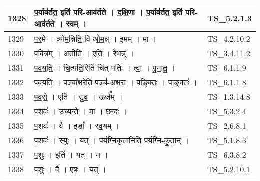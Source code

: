 \documentclass[17pt]{extarticle}
\begin{document}
\begin{longtable}{||p{0.4in}||p{4.9in}||p{0.9in}||}
    \hline
        
    1328 & प॒र्याव॑र्तत॒ इति॑ परि{-}आव॑र्तते   ।   द॒क्षि॒णा   ।   प॒र्याव॑र्तत॒ इति॑ परि{-}आव॑र्तते   ।   स्वम्   ।    & TS\_5.2.1.3       \\
    
    \hline
        
    1329 & प॒र॒मे   ।   व्यो॑म॒न्निति॒ वि{-}ओ॒म॒न्न्   ।   इ॒मम्   ।   मा   ।    & TS\_4.2.10.2       \\
    
    \hline
        
    1330 & प॒वित्र᳚म्   ।   अतीति॑   ।   ए॒ति॒   ।   रेभन्न्॑   ।    & TS\_3.4.11.2       \\
    
    \hline
        
    1331 & प॒व॒य॒ति॒   ।   चि॒त्पति॒रिति॑ चित्{-}पतिः॑   ।   त्वा॒   ।   पु॒ना॒तु॒   ।    & TS\_6.1.1.9       \\
    
    \hline
        
    1332 & प॒व॒य॒ति॒   ।   पञ्चा᳚क्ष॒रेति॒ पञ्च॑{-}अ॒क्ष॒रा॒   ।   प॒ङ्क्तिः   ।   पाङ्क्तः॑   ।    & TS\_6.1.1.8       \\
    
    \hline
        
    1333 & प॒व॒से॒   ।   एति॑   ।   सु॒व॒   ।   ऊर्ज᳚म्   ।    & TS\_1.3.14.8       \\
    
    \hline
        
    1334 & प॒शवः॑   ।   उ॒च्य॒न्ते॒   ।   मा   ।   छन्दः॑   ।    & TS\_5.3.2.4       \\
    
    \hline
        
    1335 & प॒शवः॑   ।   वै   ।   इडा᳚   ।   स्व॒यम्   ।    & TS\_2.6.8.1       \\
    
    \hline
        
    1336 & प॒शवः॑   ।   स्युः॒   ।   यत्   ।   पर्य॑ग्निकृता॒निति॒ पर्य॑ग्नि{-}कृ॒ता॒न्   ।    & TS\_5.1.8.3       \\
    
    \hline
        
    1337 & प॒शुः   ।   इति॑   ।   यत्   ।   न   ।    & TS\_6.3.8.2       \\
    
    \hline
        
    1338 & प॒शुः   ।   वै   ।   ए॒षः   ।   यत्   ।    & TS\_5.2.10.1       \\
    

\end{longtable}
\end{document}
